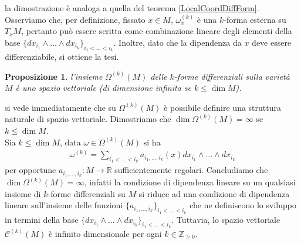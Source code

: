 \documentclass[twoside, 11pt]{amsbook}
\makeatletter
\newcommand{\0}{{(0)}}
\newcommand{\3}{{(3)}}
\theoremstyle{colonplain}
\newtheorem{prop}[thm]{Proposizione}
\theoremstyle{colondefinition}
\theoremstyle{colonremark}
\numberwithin{equation}{chapter}
\renewcommand{\proofname}{Dimostrazione}
\renewenvironment{proof}[1][\proofname]{\par
  \pushQED{\qed}%
  \normalfont \topsep6\p@\@plus6\p@\relax
  \trivlist
  \item[\hskip\labelsep\bfseries #1:]\ignorespaces
}{%
  \popQED\endtrivlist\@endpefalse
}
\makeatother
\begin{document}
\begin{proof} la dimostrazione è analoga a quella del teorema \ref{LocalCoordDiffForm}. Osserviamo che, per definizione, fissato $x \in M$, $\omega^{(k)}_x$ è una $k$-forma esterna su $T_xM$, pertanto può essere scritta come combinazione lineare degli elementi della base $\{dx_{i_1} \wedge \dots \wedge dx_{i_k}\}_{i_1 < \dots < i_k}$. Inoltre, dato che la dipendenza da $x$ deve essere differenziabile, si ottiene la tesi.
\end{proof}
\begin{prop} l'insieme $\Omega^{(k)}(M)$ delle $k$-forme differenziali sulla varietà $M$ è uno spazio vettoriale (di dimensione infinita se $k \leq \dim M$).
\end{prop}

\begin{proof} si vede immediatamente che su $\Omega^{(k)}(M)$ è possibile definire una struttura naturale di spazio vettoriale. Dimostriamo che $\dim \Omega^{(k)}(M) = \infty$ se $k \leq \dim M$. \\
Sia $k \leq \dim M$, data $\omega \in \Omega^{(k)}(M)$ si ha 
\begin{align}
   \omega^{(k)} = \sum_{i_1 < \dots < i_k}a_{i_1, \dots, i_k}(x)dx_{i_1} \wedge \dots \wedge dx_{i_k} 
\end{align}
per opportune $a_{i_1, \dots, i_k} : M \longrightarrow \mathbb{R}$ sufficientemente regolari. Concludiamo che $\dim \Omega^{(k)}(M) = \infty$, infatti la condizione di dipendenza lineare su un qualsiasi insieme di $k$-forme differenziali su $M$ si riduce ad una condizione di dipendenza lineare sull'insieme delle funzioni $\{a_{i_1, \dots, i_k}\}_{i_1 < \dots < i_k}$ che ne definiscono lo sviluppo in termini della base $\{dx_{i_1} \wedge \dots \wedge dx_{i_k}\}_{i_1 < \dots < i_k}$. Tuttavia, lo spazio vettoriale $\mathcal{C}^{(k)}(M)$ è infinito dimensionale per ogni $k \in \mathbb{Z}_{\geq 0}$.
\end{proof}
\end{document}
